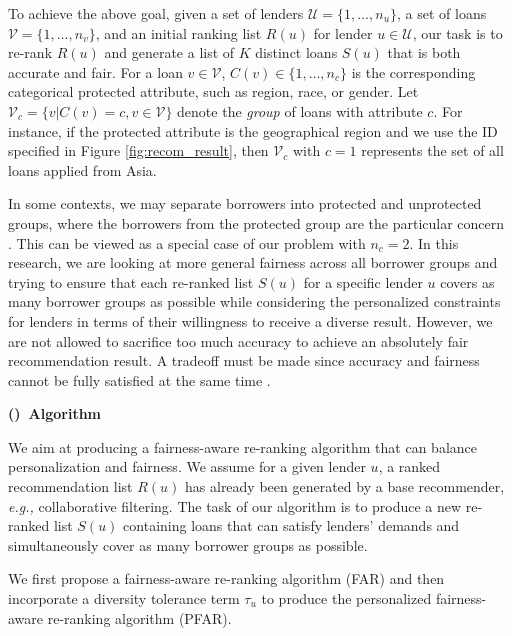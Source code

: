 To achieve the above goal, given a set of lenders $\mathcal U=\{1,\ldots,n_u\}$, a set of loans $\mathcal V=\{1,\ldots,n_v\}$, and an initial ranking list $R(u)$ for lender $u\in \mathcal U$, our task is to re-rank $R(u)$ and generate a list of $K$ distinct loans $S(u)$ that is both accurate and fair. For a loan $v\in\mathcal V$, $C(v)\in\{1,\ldots,n_c\}$ is the corresponding categorical protected attribute, such as region, race, or gender. Let $\mathcal V_c=\{v|C(v)=c, v\in \mathcal V\}$ denote the \emph{group} of loans with attribute $c$. For instance, if the protected attribute is the geographical region and we use the ID specified in Figure \ref{fig:recom_result}, then $\mathcal V_c$ with $c=1$ represents the set of all loans applied from Asia.


In some contexts, we may separate borrowers into protected and unprotected groups, where the borrowers from the protected group are the particular concern \cite{zliobaite2015survey}. This can be viewed as a special case of our problem with $n_c=2$. In this research, we are looking at more general fairness across all borrower groups and trying to ensure that each re-ranked list $S(u)$ for a specific lender $u$ covers as many borrower groups as possible while considering the personalized constraints for lenders in terms of their willingness to receive a diverse result.
However, we are not allowed to sacrifice too much accuracy to achieve an absolutely fair recommendation result. A tradeoff must be made since accuracy and fairness cannot be fully satisfied at the same time \cite{burke_robin_multisided_nodate}.


\vspace{0.25cm}
\noindent \textbf{()~Algorithm}
\vspace{0.25cm}


We aim at producing a fairness-aware re-ranking algorithm that can balance personalization and fairness. We assume for a given lender $u$, a ranked recommendation list $R(u)$ has already been generated by a base recommender, \emph{e.g.,} collaborative filtering. The task of our algorithm is to produce a new re-ranked list $S(u)$ containing loans that can satisfy lenders' demands and simultaneously cover as many borrower groups as possible.

We first propose a fairness-aware re-ranking algorithm (FAR) and then incorporate a diversity tolerance term $\tau_u$ to produce the personalized fairness-aware re-ranking algorithm (PFAR).


